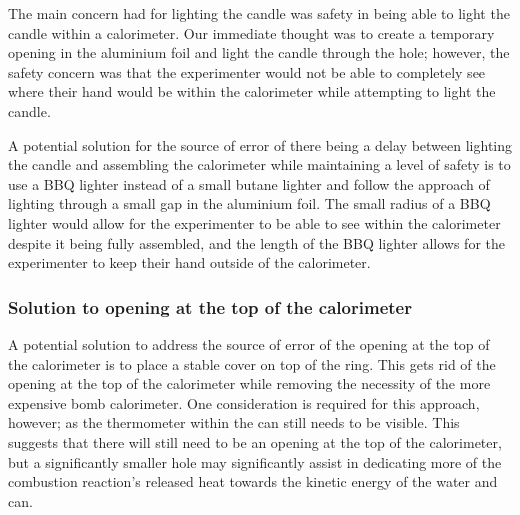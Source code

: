 \documentclass[
	letterpaper, %
	12pt, %
]{CSUniSchoolLabReport}
\begin{document}
The main concern had for lighting the candle was safety in being able to light the candle
within a calorimeter. Our immediate thought was to create a temporary opening in the
aluminium foil and light the candle through the hole; however, the safety concern was that
the experimenter would not be able to completely see where their hand would be within the calorimeter
while attempting to light the candle.

A potential solution for the source of error of there being a delay between lighting the
candle and assembling the calorimeter while maintaining a level of safety is to use a
BBQ lighter instead of a small butane lighter and follow the approach of lighting through
a small gap in the aluminium foil. The small radius of a BBQ lighter would allow for the
experimenter to be able to see within the calorimeter despite it being fully assembled,
and the length of the BBQ lighter allows for the experimenter to keep their hand outside of
the calorimeter.


\subsubsection{Solution to opening at the top of the calorimeter}

A potential solution to address the source of error of the opening at the top of the calorimeter
is to place a stable cover on top of the ring. This gets rid of the opening at the top of the calorimeter
while removing the necessity of the more expensive bomb calorimeter. One consideration is
required for this approach, however; as the thermometer within the can still needs to be visible.
This suggests that there will still need to be an opening at the top of the calorimeter, but
a significantly smaller hole may significantly assist in dedicating more of the combustion reaction's
released heat towards the kinetic energy of the water and can.


\printbibliography %

\end{document}

